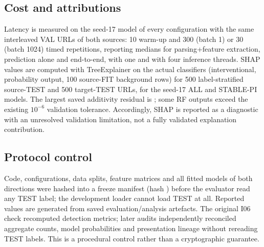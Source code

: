 \subsection{Cost and attributions}
Latency is measured on the seed-17 model of every configuration with the same interleaved VAL URLs of both sources: 10 warm-up and 300 (batch 1) or 30 (batch 1024) timed repetitions, reporting medians for parsing+feature extraction, prediction alone and end-to-end, with one and with four inference threads. SHAP values are computed with TreeExplainer on the actual classifiers (interventional, probability output, 100 source-FIT background rows) for 500 label-stratified source-TEST and 500 target-TEST URLs, for the seed-17 ALL and STABLE-PI models. The largest saved additivity residual is ; some RF outputs exceed the existing $10^{-6}$ validation tolerance. Accordingly, SHAP is reported as a diagnostic with an unresolved validation limitation, not a fully validated explanation contribution.

\subsection{Protocol control}
Code, configurations, data splits, feature matrices and all fitted models of both directions were hashed into a freeze manifest (hash \texttt{}) before the evaluator read any TEST label; the development loader cannot load TEST at all. Reported values are generated from saved evaluation/analysis artefacts. The original I06 check recomputed detection metrics; later audits independently reconciled aggregate counts, model probabilities and presentation lineage without rereading TEST labels. This is a procedural control rather than a cryptographic guarantee.
